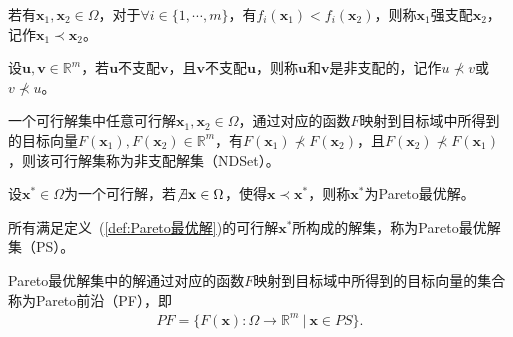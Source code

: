 \par
\begin{definition}[强支配]
    \label{def:强支配}
    若有$\mathbf{x}_1,\mathbf{x}_2 \in \Omega$，对于$\forall i \in \{ 1, \cdots, m \}$，有$f_i(\mathbf{x}_1) < f_i(\mathbf{x}_2)$，则称$\mathbf{x}_1$强支配$\mathbf{x}_2$，记作$\mathbf{x}_1 \prec \mathbf{x}_2$。
\end{definition}
\par
\begin{definition}[非支配]
    \label{def:非支配}
    设$\mathbf{u}, \mathbf{v} \in \mathbb{R}^m$，若$\mathbf{u}$不支配$\mathbf{v}$，且$\mathbf{v}$不支配$\mathbf{u}$，则称$\mathbf{u}$和$\mathbf{v}$是非支配的，记作$u \not \prec v$或$v \not \prec u$。
\end{definition}
\par
\begin{definition}
    \label{def:非支配解集}
    一个可行解集中任意可行解$\mathbf{x}_1, \mathbf{x}_2 \in \Omega$，通过对应的函数$F$映射到目标域中所得到的目标向量$F(\mathbf{x}_1), F(\mathbf{x}_2) \in \mathbb{R}^m$，有$F(\mathbf{x}_1) \not \prec F(\mathbf{x}_2)$，且$F(\mathbf{x}_2) \not \prec F(\mathbf{x}_1)$，则该可行解集称为非支配解集（NDSet）。
\end{definition}
\par
\begin{definition}[Pareto最优解]
    \label{def:Pareto最优解}
    设$\mathbf{x}^* \in \Omega$为一个可行解，若$\not \exists \mathbf{x} \in \Omega$，使得$\mathbf{x} \prec \mathbf{x}^*$，则称$\mathbf{x}^*$为Pareto最优解。
\end{definition}
\par
\begin{definition}
    \label{def:Pareto最优解集}
    所有满足定义~(\ref{def:Pareto最优解})的可行解$\mathbf{x}^*$所构成的解集，称为Pareto最优解集（PS）。
\end{definition}
\par
\begin{definition}
    \label{def:Pareto前沿}
    Pareto最优解集中的解通过对应的函数$F$映射到目标域中所得到的目标向量的集合称为Pareto前沿（PF），即
    \begin{align}
        \label{eq:Pareto前沿}
        PF = \{ F(\mathbf{x}): \Omega \rightarrow \mathbb{R}^m \ | \ \mathbf{x} \in PS \}.
    \end{align}
\end{definition}
\par
